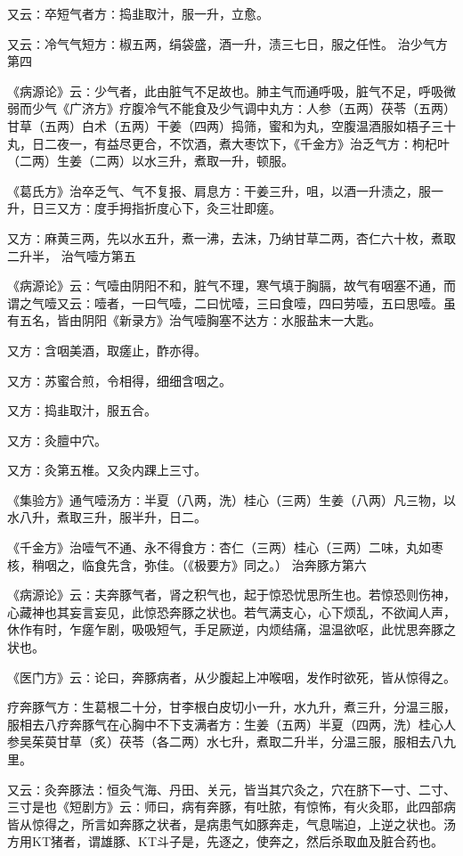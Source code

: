 \documentclass[a4paper,12pt,UTF8,twoside]{ctexbook}
\begin{document}
又云∶卒短气者方∶捣韭取汁，服一升，立愈。

又云∶冷气气短方∶椒五两，绢袋盛，酒一升，渍三七日，服之任性。
治少气方第四

《病源论》云∶少气者，此由脏气不足故也。肺主气而通呼吸，脏气不足，呼吸微弱而少气《广济方》疗腹冷气不能食及少气调中丸方∶人参（五两）茯苓（五两）甘草（五两）白术（五两）干姜（四两）捣筛，蜜和为丸，空腹温酒服如梧子三十丸，日二夜一，有益尽更合，不饮酒，煮大枣饮下，《千金方》治乏气方∶枸杞叶（二两）生姜（二两）以水三升，煮取一升，顿服。

《葛氏方》治卒乏气、气不复报、肩息方∶干姜三升，咀，以酒一升渍之，服一升，日三又方∶度手拇指折度心下，灸三壮即瘥。

又方∶麻黄三两，先以水五升，煮一沸，去沫，乃纳甘草二两，杏仁六十枚，煮取二升半，
治气噎方第五

《病源论》云∶气噎由阴阳不和，脏气不理，寒气填于胸膈，故气有咽塞不通，而谓之气噎又云∶噎者，一曰气噎，二曰忧噎，三曰食噎，四曰劳噎，五曰思噎。虽有五名，皆由阴阳《新录方》治气噎胸塞不达方∶水服盐末一大匙。

又方∶含咽美酒，取瘥止，酢亦得。

又方∶苏蜜合煎，令相得，细细含咽之。

又方∶捣韭取汁，服五合。

又方∶灸膻中穴。

又方∶灸第五椎。又灸内踝上三寸。

《集验方》通气噎汤方∶半夏（八两，洗）桂心（三两）生姜（八两）凡三物，以水八升，煮取三升，服半升，日二。

《千金方》治噎气不通、永不得食方∶杏仁（三两）桂心（三两）二味，丸如枣核，稍咽之，临食先含，弥佳。（《极要方》同之。）
治奔豚方第六

《病源论》云∶夫奔豚气者，肾之积气也，起于惊恐忧思所生也。若惊恐则伤神，心藏神也其妄言妄见，此惊恐奔豚之状也。若气满支心，心下烦乱，不欲闻人声，休作有时，乍瘥乍剧，吸吸短气，手足厥逆，内烦结痛，温温欲呕，此忧思奔豚之状也。

《医门方》云∶论曰，奔豚病者，从少腹起上冲喉咽，发作时欲死，皆从惊得之。

疗奔豚气方∶生葛根二十分，甘李根白皮切小一升，水九升，煮三升，分温三服，服相去八疗奔豚气在心胸中不下支满者方∶生姜（五两）半夏（四两，洗）桂心人参吴茱萸甘草（炙）茯苓（各二两）水七升，煮取二升半，分温三服，服相去八九里。

又云∶灸奔豚法∶恒灸气海、丹田、关元，皆当其穴灸之，穴在脐下一寸、二寸、三寸是也《短剧方》云∶师曰，病有奔豚，有吐脓，有惊怖，有火灸耶，此四部病皆从惊得之，所言如奔豚之状者，是病患气如豚奔走，气息喘迫，上逆之状也。汤方用KT猪者，谓雄豚、KT斗子是，先逐之，使奔之，然后杀取血及脏合药也。
\end{document}
